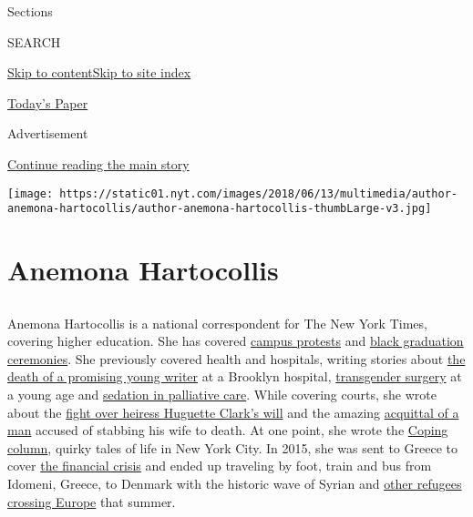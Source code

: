 Sections

SEARCH

\protect\hyperlink{site-content}{Skip to
content}\protect\hyperlink{site-index}{Skip to site index}

\href{https://myaccount.nytimes.com/auth/login?response_type=cookie\&client_id=vi}{}

\href{https://www.nytimes.com/section/todayspaper}{Today's Paper}

Advertisement

\protect\hyperlink{after-top}{Continue reading the main story}

\texttt{[image: https://static01.nyt.com/images/2018/06/13/multimedia/author-anemona-hartocollis/author-anemona-hartocollis-thumbLarge-v3.jpg]}

\hypertarget{anemona-hartocollis}{%
\section{Anemona Hartocollis}\label{anemona-hartocollis}}

\subsection{}

Anemona Hartocollis is a national correspondent for The New York Times,
covering higher education. She has covered
\href{https://www.nytimes.com/2016/08/05/us/college-protests-alumni-donations.html}{campus
protests} and
\href{https://www.nytimes.com/2017/06/02/us/black-commencement-harvard.html}{black
graduation ceremonies}. She previously covered health and hospitals,
writing stories about
\href{http://www.nytimes.com/2012/07/29/nyregion/the-short-life-and-lonely-death-of-sabrina-seelig.html}{the
death of a promising young writer} at a Brooklyn hospital,
\href{https://www.nytimes.com/2015/06/17/nyregion/transgender-minors-gender-reassignment-surgery.html}{transgender
surgery} at a young age and
\href{http://www.nytimes.com/2009/12/27/health/27sedation.html}{sedation
in palliative care}. While covering courts, she wrote about the
\href{http://www.nytimes.com/2013/09/15/nyregion/the-two-wills-of-the-heiress-huguette-clark.html}{fight
over heiress Huguette Clark's will} and the amazing
\href{http://www.nytimes.com/2007/01/20/nyregion/20murder.html}{acquittal
of a man} accused of stabbing his wife to death. At one point, she wrote
the
\href{http://www.nytimes.com/2005/01/09/nyregion/thecity/when-the-foe-next-door-is-a-lot-like-you.html}{Coping
column}, quirky tales of life in New York City. In 2015, she was sent to
Greece to cover
\href{https://www.nytimes.com/2015/07/06/world/europe/greeks-emphatic-no-and-a-rebuke-over-austerity.html}{the
financial crisis} and ended up traveling by foot, train and bus from
Idomeni, Greece, to Denmark with the historic wave of Syrian and
\href{https://www.nytimes.com/interactive/2015/10/22/world/europe/syrian-refugees.html}{other
refugees crossing Europe} that summer.

